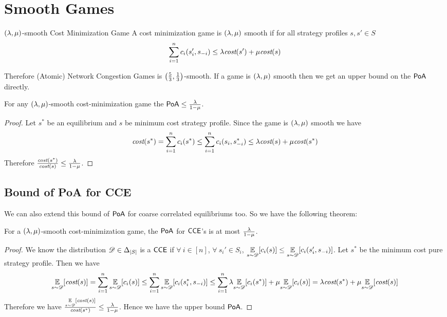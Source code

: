 \section{Smooth Games}
\begin{Definition}{$(\lambda,\mu)$-smooth Cost Minimization Game}{}
	A cost minimization game is $(\lambda,\mu)$ smooth if for all strategy profiles $s,s'\in S$ $$\sum\limits_{i=1}^n c_i(s'_i,s_{-i})\leq \lambda \textit{cost}(s')+\mu\textit{cost}(s)$$
\end{Definition}

Therefore (Atomic) Network Congestion Games is $\left(\frac53,\frac13\right)$-smooth. If a game is $(\lambda,\mu)$ smooth then we get an upper bound on the $\operatorname{\mathsf{PoA}}$ directly. 
\begin{Theorem}{}{}
	For any $(\lambda,\mu)$-smooth cost-minimization game the $\operatorname{\mathsf{PoA}}\leq \frac{\lambda}{1-\mu}$. 
\end{Theorem}
\begin{proof}
	Let $s^*$ be an equilibrium and $s$ be minimum cost strategy profile. Since the game is $(\lambda,\mu)$ smooth we have $$\textit{cost}(s^*)=\sum\limits_{i=1}^n c_i(s^*)\leq \sum\limits_{i=1}^n c_i(s_i,s_{-i}^*)\leq \lambda \textit{cost}(s)+\mu\textit{cost}(s^*)$$Therefore $\frac{\textit{cost}(s^*)}{\textit{cost}(s)}\leq \frac{\lambda}{1-\mu}$.
\end{proof}
\subsection{Bound of \textsf{PoA} for \textsf{CCE}}
We can also extend this bound of $\operatorname{\mathsf{PoA}}$ for coarse correlated equilibriums too. So we have the following theorem:
\begin{Theorem}{}{}
	For a $(\lambda,\mu)$-smooth cost-minimization game, the $\operatorname{\mathsf{PoA}}$ for $\operatorname{\mathsf{CCE}}$'s is at most $\frac{\lambda}{1-\mu}$.
\end{Theorem}
\begin{proof}
	We know the distribution ${\mathscr{D}}\in\Delta_{|S|}$ is a $\operatorname{\mathsf{CCE}}$ if $\forall \ i\in[n]$, $\forall\ s_i'\in S_i$, $\underset{s\sim {\mathscr{D}}}{\mathbb{E}}[c_i(s)]\leq \underset{s\sim {\mathscr{D}}}{\mathbb{E}}[c_i(s_i',s_{-i})]$. Let $s^*$ be the minimum cost pure strategy profile. Then we have 
	\[	\underset{s\sim {\mathscr{D}}}{\mathbb{E}}[\textit{cost}(s)] =\sum_{i=1}^n \underset{s\sim {\mathscr{D}}}{\mathbb{E}}[c_i(s)]\leq \sum_{i=1}^n \underset{s\sim {\mathscr{D}}}{\mathbb{E}}[c_i(s_i^*,s_{-i})]\leq \sum_{i=1}^n \lambda \underset{s\sim {\mathscr{D}}}{\mathbb{E}}[c_i(s^*)]+\mu\underset{s\sim {\mathscr{D}}}{\mathbb{E}}[c_i(s)]=\lambda \textit{cost}(s^*)+\mu \underset{s\sim {\mathscr{D}}}{\mathbb{E}}[\textit{cost}(s)]\]Therefore we have $\frac{\underset{s\sim {\mathscr{D}}}{\mathbb{E}}[\textit{cost}(s)]}{\textit{cost}(s^*)}\leq \frac{\lambda}{1-\mu}$. Hence we have the upper bound $\operatorname{\mathsf{PoA}}$. 

\end{proof}
